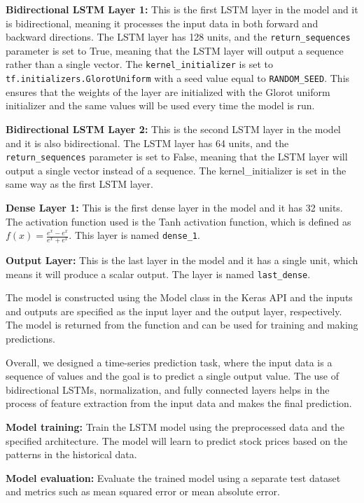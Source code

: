 \documentclass[a4paper]{article}
\begin{document}
\textbf{Bidirectional LSTM Layer 1:} This is the first LSTM layer in the model and it is bidirectional, meaning it processes the input data in both forward and backward directions. The LSTM layer has 128 units, and the \texttt{return\_sequences} parameter is set to True, meaning that the LSTM layer will output a sequence rather than a single vector. The \texttt{kernel\_initializer} is set to \texttt{tf.initializers.GlorotUniform} with a seed value equal to \texttt{RANDOM\_SEED}. This ensures that the weights of the layer are initialized with the Glorot uniform initializer and the same values will be used every time the model is run.

\textbf{Bidirectional LSTM Layer 2:} This is the second LSTM layer in the model and it is also bidirectional. The LSTM layer has 64 units, and the \texttt{return\_sequences} parameter is set to False, meaning that the LSTM layer will output a single vector instead of a sequence. The kernel\_initializer is set in the same way as the first LSTM layer.

\textbf{Dense Layer 1:} This is the first dense layer in the model and it has 32 units. The activation function used is the Tanh activation function, which is defined as $f(x) = \frac{e^{x}-e^{x}}{e^{x}+e^{x}}$. This layer is named \texttt{dense\_1}.

\textbf{Output Layer:} This is the last layer in the model and it has a single unit, which means it will produce a scalar output. The layer is named \texttt{last\_dense}.

The model is constructed using the Model class in the Keras API and the inputs and outputs are specified as the input layer and the output layer, respectively. The model is returned from the function and can be used for training and making predictions.

Overall, we designed a time-series prediction task, where the input data is a sequence of values and the goal is to predict a single output value. The use of bidirectional LSTMs, normalization, and fully connected layers helps in the process of feature extraction from the input data and makes the final prediction.

\textbf{Model training:} Train the LSTM model using the preprocessed data and the specified architecture. The model will learn to predict stock prices based on the patterns in the historical data.

\textbf{Model evaluation:} Evaluate the trained model using a separate test dataset and metrics such as mean squared error or mean absolute error.
\end{document}
